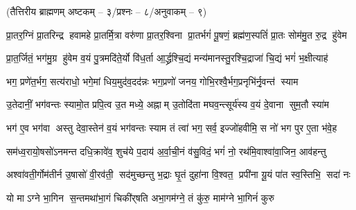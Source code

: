 

\vspace{-1ex}
\centerline{\normalsize(तैत्तिरीय ब्राह्मणम् अष्टकम् – ३/प्रश्नः – ८/अनुवाकम् – ९)}


\twolineshloka
{प्रा॒तर॒ग्निं प्रा॒तरिन्द्र हवामहे प्रा॒तर्मि॒त्रा वरु॑णा प्रा॒तर॒श्विना}
{प्रा॒तर्भगं॑ पू॒षणं॒ ब्रह्म॑ण॒स्पतिं॑ प्रा॒तः सोम॑मु॒त रु॒द्र हु॑वेम}

\twolineshloka
{प्रा॒त॒र्जितं॒ भग॑मु॒ग्र हु॑वेम व॒यं पु॒त्रमदि॑ते॒र्यो वि॑ध॒र्ता}
{आ॒र्द्ध्रश्चि॒द्यं मन्य॑मानस्तु॒रश्चि॒द्राजा॑ चि॒द्यं भगं॑ भ॒क्षीत्याह॑}

\twolineshloka
{भग॒ प्रणे॑त॒र्भग॒ सत्य॑राधो॒ भगे॒मां धिय॒मुद॑व॒दद॑न्नः}
{भग॒प्रणो॑ जनय॒ गोभि॒रश्वै॒र्भग॒प्रनृभि॑र्नृ॒वन्त॑ स्याम}

\twolineshloka
{उ॒तेदानीं॒ भग॑वन्तः स्यामो॒त प्रपि॒त्व उ॒त मध्ये॒ अह्नाम्}
{उ॒तोदि॑ता मघव॒न्त्सूर्य॑स्य व॒यं दे॒वाना सुम॒तौ स्या॑म}

\twolineshloka
{भग॑ ए॒व भग॑वा अस्तु देवा॒स्तेन॑ व॒यं भग॑वन्तः स्याम}
{तं त्वा॑ भग॒ सर्व॒ इज्जो॑हवीमि॒ स नो॑ भग पुर ए॒ता भ॑वे॒ह}

\twolineshloka
{सम॑ध्व॒रायो॒षसो॑ऽनमन्त दधि॒क्रावे॑व॒ शुच॑ये प॒दाय॑}
{अ॒र्वा॒ची॒नं व॑सु॒विदं॒ भगं॑ नो॒ रथ॑मि॒वाश्वा॑वा॒जिन॒ आव॑हन्तु}

\twolineshloka
{अश्वा॑वती॒र्गोम॑तीर्न उ॒षासो॑ वी॒रव॑ती॒ सद॑मुच्छन्तु भ॒द्राः}
{घृ॒तं दुहा॑ना वि॒श्वत॒ प्रपी॑ना यू॒यं पा॑त स्व॒स्तिभि॒ सदा॑ नः}

\twolineshloka
{यो माऽग्ने भा॒गिन स॒न्तमथा॑भा॒गं चिकी॑र्‌षति}
{अभा॒गम॑ग्ने॒ तं कु॑रु॒ माम॑ग्ने भा॒गिनं॑ कुरु}


